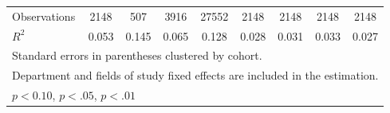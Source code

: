 \begin{table}[htbp]
\begin{adjustbox}{max width=1\textwidth}
\begin{tabular}{l*{8}{c}}
\hline
Observations       &        2148         &         507         &        3916         &       27552         &        2148         &        2148         &        2148         &        2148         \\
\(R^{2}\)   &       0.053         &       0.145         &       0.065         &       0.128         &       0.028         &       0.031         &       0.033         &       0.027         \\
\hline \hline
\multicolumn{9}{l}{\footnotesize Standard errors in parentheses clustered by cohort.}\\
\multicolumn{9}{l}{\footnotesize Department and fields of study fixed effects are included in the estimation.}\\
\multicolumn{9}{l}{\footnotesize \sym{*} \(p<0.10\), \sym{**} \(p<.05\), \sym{***} \(p<.01\)}\\
\end{tabular}%
	\end{adjustbox}
\end{table}